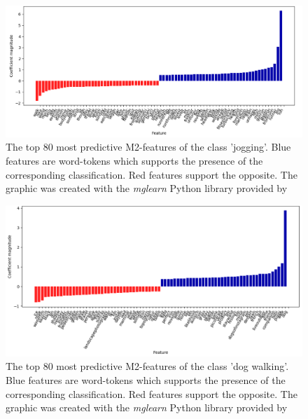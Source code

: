 \begin{figure}[h!]
   \centering
   \includegraphics[width=\textwidth]{img/m2_top40_features_Jogging_cropped.pdf}
   \caption{The top 80 most predictive M2-features of the class 'jogging'. Blue features are word-tokens which supports the presence of the corresponding classification. Red features support the opposite. The graphic was created with the \textit{mglearn} Python library provided by \textcite{Guido2016}}
   \label{fig:M2_top40_features_jogging}
\end{figure}
\begin{figure}[h!]
   \centering
   \includegraphics[width=\textwidth]{img/m2_top40_features_dog_walking_cropped.pdf}
   \caption{The top 80 most predictive M2-features of the class 'dog walking'. Blue features are word-tokens which supports the presence of the corresponding classification. Red features support the opposite. The graphic was created with the \textit{mglearn} Python library provided by \textcite{Guido2016}}
   \label{fig:M2_top40_features_dog_walking}
\end{figure}
